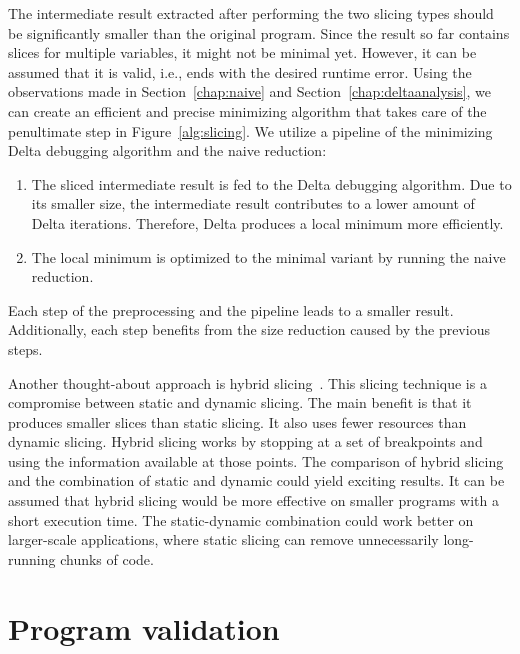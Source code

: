 The intermediate result extracted after performing the two slicing types 
should be significantly smaller than the original program.
Since the result so far contains slices for multiple variables, it might not 
be minimal yet.
However, it can be assumed that it is valid, i.e., ends with the desired 
runtime error.
Using the observations made in Section~\ref{chap:naive} and 
Section~\ref{chap:deltaanalysis}, we can create an efficient and 
precise minimizing algorithm that takes care of the penultimate step 
in Figure~\ref{alg:slicing}. 
We utilize a pipeline of the minimizing Delta debugging algorithm and 
the naive reduction:
\begin{enumerate}
  \item The sliced intermediate result is fed to the Delta debugging 
  algorithm. 
  Due to its smaller size, the intermediate result contributes to a lower 
  amount of Delta iterations. 
  Therefore, Delta produces a local minimum more efficiently.
  \item The local minimum is optimized to the minimal variant by running 
  the naive reduction.
\end{enumerate}
Each step of the preprocessing and the pipeline leads to a smaller result. 
Additionally, each step benefits from the size reduction caused by 
the previous steps.

Another thought-about approach is hybrid slicing~\citep{Gupta97}.
This slicing technique is a compromise between static and dynamic slicing. 
The main benefit is that it produces smaller slices than static slicing. 
It also uses fewer resources than dynamic slicing. 
Hybrid slicing works by stopping at a set of breakpoints and using 
the information available at those points.
The comparison of hybrid slicing and the combination of static and dynamic 
could yield exciting results.
It can be assumed that hybrid slicing would be more effective on smaller 
programs with a short execution time.
The static-dynamic combination could work better on larger-scale 
applications, where static slicing can remove unnecessarily long-running 
chunks of code.

\section{Program validation}\label{chap:verification}

